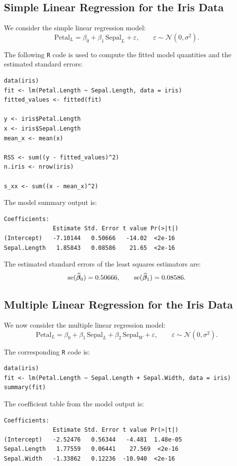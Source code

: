 \subsection{Simple Linear Regression for the Iris Data}

We consider the simple linear regression model:
\[
\text{Petal}_L = \beta_0 + \beta_1 \,\text{Sepal}_L + \varepsilon,
\qquad \varepsilon \sim \mathcal{N}(0,\sigma^2).
\]

The following \texttt{R} code is used to compute the fitted model quantities and the estimated standard errors:
\begin{verbatim}
data(iris)
fit <- lm(Petal.Length ~ Sepal.Length, data = iris)
fitted_values <- fitted(fit)

y <- iris$Petal.Length
x <- iris$Sepal.Length
mean_x <- mean(x)

RSS <- sum((y - fitted_values)^2)
n.iris <- nrow(iris)

s_xx <- sum((x - mean_x)^2)
\end{verbatim}

The model summary output is:
\begin{verbatim}
Coefficients:
              Estimate Std. Error t value Pr(>|t|)
(Intercept)   -7.10144   0.50666   -14.02  <2e-16
Sepal.Length   1.85843   0.08586    21.65  <2e-16
\end{verbatim}

The estimated standard errors of the least squares estimators are:
\[
\mathrm{se}(\widehat{\boldsymbol{\beta}}_0) = 0.50666,
\qquad
\mathrm{se}(\widehat{\boldsymbol{\beta}}_1) = 0.08586.
\]

\subsection{Multiple Linear Regression for the Iris Data}

We now consider the multiple linear regression model:
\[
\text{Petal}_L
= \beta_0 + \beta_1 \,\text{Sepal}_L + \beta_2 \,\text{Sepal}_W + \varepsilon,
\qquad \varepsilon \sim \mathcal{N}(0,\sigma^2).
\]

The corresponding \texttt{R} code is:
\begin{verbatim}
data(iris)
fit <- lm(Petal.Length ~ Sepal.Length + Sepal.Width, data = iris)
summary(fit)
\end{verbatim}

The coefficient table from the model output is:
\begin{verbatim}
Coefficients:
              Estimate Std. Error t value Pr(>|t|)
(Intercept)   -2.52476   0.56344   -4.481  1.48e-05
Sepal.Length   1.77559   0.06441    27.569  <2e-16
Sepal.Width   -1.33862   0.12236  -10.940  <2e-16
\end{verbatim}


